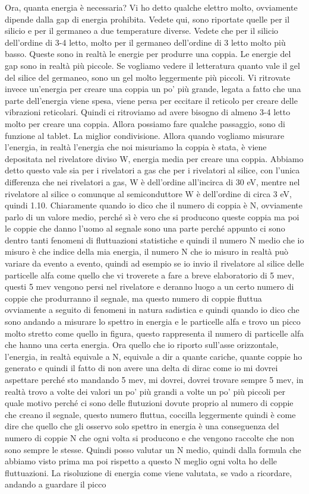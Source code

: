 Ora, quanta energia è necessaria? Vi ho detto qualche elettro molto, ovviamente dipende dalla gap di energia prohibita. Vedete qui, sono riportate quelle per il silicio e per il germaneo a due temperature diverse. Vedete che per il silicio dell'ordine di 3-4 letto, molto per il germaneo dell'ordine di 3 letto molto più basso. Queste sono in realtà le energie per produrre una coppia. Le energie del gap sono in realtà più piccole. Se vogliamo vedere il letteratura quanto vale il gel del silice del germaneo, sono un gel molto leggermente più piccoli. Vi ritrovate invece un'energia per creare una coppia un po' più grande, legata a fatto che una parte dell'energia viene spesa, viene persa per eccitare il reticolo per creare delle vibrazioni reticolari. Quindi ci ritroviamo ad avere bisogno di almeno 3-4 letto molto per creare una coppia. Allora possiamo fare qualche passaggio, sono di funzione al tablet. La miglior condivisione. Allora quando vogliamo misurare l'energia, in realtà l'energia che noi misuriamo la coppia è stata, è viene depositata nel rivelatore diviso W, energia media per creare una coppia. Abbiamo detto questo vale sia per i rivelatori a gas che per i rivelatori al silice, con l'unica differenza che nei rivelatori a gas, W è dell'ordine all'incirca di 30 eV, mentre nel rivelatore al silice o comunque al semiconduttore W è dell'ordine di circa 3 eV, quindi 1.10. Chiaramente quando io dico che il numero di coppia è N, ovviamente parlo di un valore medio, perché sì è vero che si producono queste coppia ma poi le coppie che danno l'uomo al segnale sono una parte perché appunto ci sono dentro tanti fenomeni di fluttuazioni statistiche e quindi il numero N medio che io misuro è che indice della mia energia, il numero N che io misuro in realtà può variare da evento a evento, quindi ad esempio se io invio il rivelatore al silice delle particelle alfa come quello che vi troverete a fare a breve elaboratorio di 5 mev, questi 5 mev vengono persi nel rivelatore e deranno luogo a un certo numero di coppie che produrranno il segnale, ma questo numero di coppie fluttua ovviamente a seguito di fenomeni in natura sadistica e quindi quando io dico che sono andando a misurare lo spettro in energia e le particelle alfa e trovo un picco molto stretto come quello in figura, questo rappresenta il numero di particelle alfa che hanno una certa energia. Ora quello che io riporto sull'asse orizzontale, l'energia, in realtà equivale a N, equivale a dir a quante cariche, quante coppie ho generato e quindi il fatto di non avere una delta di dirac come io mi dovrei aspettare perché sto mandando 5 mev, mi dovrei, dovrei trovare sempre 5 mev, in realtà trovo a volte dei valori un po' più grandi a volte un po' più piccoli per quale motivo perché ci sono delle flutuzioni dovute proprio al numero di coppie che creano il segnale, questo numero fluttua, coccilla leggermente quindi è come dire che quello che gli osservo solo spettro in energia è una conseguenza del numero di coppie N che ogni volta si producono e che vengono raccolte che non sono sempre le stesse. Quindi posso valutar un N medio, quindi dalla formula che abbiamo visto prima ma poi rispetto a questo N meglio ogni volta ho delle fluttuazioni. La risoluzione di energia come viene valutata, se vado a ricordare, andando a guardare il picco 